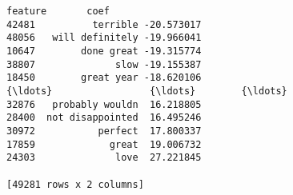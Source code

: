 \documentclass[11pt]{article}
\makeatletter
\newcommand{\boxspacing}{\kern\kvtcb@left@rule\kern\kvtcb@boxsep}
\newcommand{\prompt}[4]{
        \ttfamily\llap{{\color{#2}[#3]:\hspace{3pt}#4}}\vspace{-\baselineskip}
    }
\makeatother
\begin{document}
            \begin{tcolorbox}[breakable, size=fbox, boxrule=.5pt, pad at break*=1mm, opacityfill=0]
\prompt{Out}{outcolor}{21}{\boxspacing}
\begin{Verbatim}[commandchars=\\\{\}]
                feature       coef
42481          terrible -20.573017
48056   will definitely -19.966041
10647        done great -19.315774
38807              slow -19.155387
18450        great year -18.620106
{\ldots}                 {\ldots}        {\ldots}
32876   probably wouldn  16.218805
28400  not disappointed  16.495246
30972           perfect  17.800337
17859             great  19.006732
24303              love  27.221845

[49281 rows x 2 columns]
\end{Verbatim}
\end{tcolorbox}
        
\end{document}
